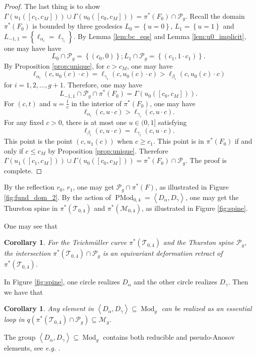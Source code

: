 \documentclass[UTF8]{amsart}
\newtheorem{corollary}[theorem]{Corollary}
\numberwithin{equation}{section}
\theoremstyle{definition}
\theoremstyle{example}
\theoremstyle{remark}
\DeclareMathOperator{\pmodo}{PMod}
\DeclareMathOperator{\modo}{Mod}
\begin{document}
\begin{proof}
 The last thing is to show $\Gamma(u_1([c_1, c_M]))\cup \Gamma(u_0([c_0, c_M])) =  \pi^{*}(F_0) \cap \mathcal{P}_g$. Recall the domain $\pi^{*}(F_0)$ is bounded by three geodesics $L_0 = \left\{ u=0 \right\} $, $L_1 = \left\{ u=1 \right\}$ and $L_{-1,1} = \left\{ \ell_{\alpha_i} = \ell_{\gamma_i} \right\} $. By Lemma \ref{lem:bc_eqs} and Lemma \ref{lem:u0_implicit}, one may have have
 \[
  L_0 \cap \mathcal{P}_g = \left\{ (c_0,0) \right\} ; L_1 \cap \mathcal{P}_g = \left\{ (c_1,1\cdot c_1) \right\}. 
 \]
By Proposition \ref{prop:unique}, for $c > c_M$, one may have
 \[
  \ell_{\alpha_i}(c,u_0(c)\cdot c) = \ell_{\gamma_i}(c,u_0(c)\cdot c) > \ell_{\beta_i}(c,u_0(c)\cdot c)
 \]
 for $i =1,2,..., g+1$. Therefore, one may have
 \[
  L_{-1,1} \cap \mathcal{P}_g \cap \pi^{*}(F_0) = \Gamma(u_0([c_0,c_M])). 
 \]
 For $(c,t)$ and $u = \frac{t}{c}$ in the interior of $\pi^{*}(F_0)$, one may have
 \[
  \ell_{\alpha_i}(c,u\cdot c) > \ell_{\gamma_i}(c,u\cdot c). 
 \]
 For any fixed $c>0$, there is at most one $u\in (0,1]$ satisfying 
 \[
  \ell_{\beta_i}(c,u\cdot c) = \ell_{\gamma_i}(c,u\cdot c). 
 \]
 This point is the point $(c,u_1(c))$ when  $c \ge c_1$. This point is in $\pi^{*}(F_0)$ if and only if $c \le c_{M}$ by Proposition \ref{prop:unique}. 
 Therefore $\Gamma(u_1([c_1, c_M]))\cup \Gamma(u_0([c_0, c_M])) =  \pi^{*}(F_0) \cap \mathcal{P}_g$. The proof is complete. 

\end{proof}

By the reflection $r_0$, $r_1$, one may get $\mathcal{P}_g \cap \pi^{*}(F)$, as illustrated in Figure \ref{fig:fund_dom_2}. 
By the action of $\pmodo_{0,4} = \left< D_{\alpha}, D_{\gamma} \right>$, one may get the Thurston spine in $\pi^{*}(\mathcal{T}_{0,4})$ and $\pi^{*}(\mathcal{M}_{0,4})$, as illustrated in Figure \ref{fig:spine}. 


One may see that
\begin{corollary}

	For the Teichm\"uller curve $\pi^{*}(\mathcal{T}_{0,4})$ and the Thurston spine $\mathcal{P}_g$, the intersection  $\pi^{*}(\mathcal{T}_{0,4}) \cap \mathcal{P}_g$ is an equivariant deformation retract of $\pi^{*}(\mathcal{T}_{0,4})$. 
 \label{cor:conj}
\end{corollary}

In Figure \ref{fig:spine}, one circle realizes $D_{\alpha}$ and the other circle realizes $D_{\gamma}$. Then we have that
\begin{corollary}
	Any element in $\left<D_{\alpha}, D_{\gamma} \right> \subseteq \modo_g$ can be realized as an essential loop in $q(\pi^{*}(\mathcal{T}_{0,4})\cap \mathcal{P}_g) \subseteq \mathcal{M}_g$. 
	\label{cor:loop}
\end{corollary}
The group $\left<D_{\alpha}, D_{\gamma} \right> \subseteq \modo_g$ contains both reducible and pseudo-Anosov elements, see \emph{e.g.} \cite{thurston1988geometry}. 


 
 
\end{document}
